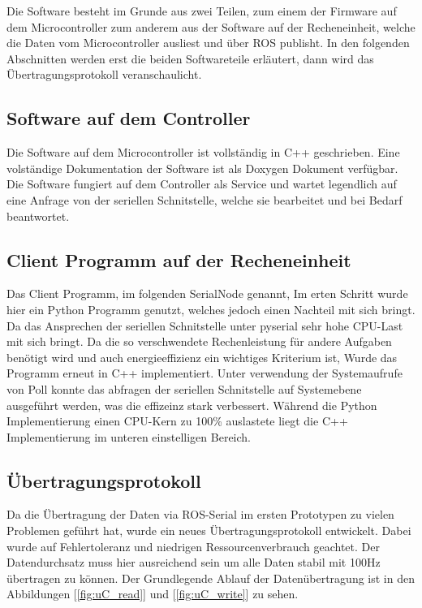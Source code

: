 Die Software besteht im Grunde aus zwei Teilen, zum einem der Firmware auf dem Microcontroller zum anderem aus der Software auf der Recheneinheit, welche die Daten vom Microcontroller ausliest und über ROS publisht.
In den folgenden Abschnitten werden erst die beiden Softwareteile erläutert, dann wird das Übertragungsprotokoll veranschaulicht.


\subsection{Software auf dem \textmu Controller}
Die Software auf dem Microcontroller ist vollständig in C++ geschrieben. Eine volständige Dokumentation der Software ist als Doxygen Dokument verfügbar. 
Die Software fungiert auf dem Controller als Service und wartet legendlich auf eine Anfrage von der seriellen Schnitstelle, welche sie bearbeitet und bei Bedarf beantwortet. 


\subsection{Client Programm auf der Recheneinheit}
Das Client Programm, im folgenden SerialNode genannt,
Im erten Schritt wurde hier ein Python Programm genutzt, welches jedoch einen Nachteil mit sich bringt. Da das Ansprechen der seriellen Schnitstelle unter pyserial sehr hohe CPU-Last mit sich bringt.
Da die so verschwendete Rechenleistung für andere Aufgaben benötigt wird und auch energieeffizienz ein wichtiges Kriterium ist, Wurde das Programm erneut in C++ implementiert. Unter verwendung der Systemaufrufe von 
Poll konnte das abfragen der seriellen Schnitstelle auf Systemebene ausgeführt werden, was die effizeinz stark verbessert. Während die Python Implementierung einen CPU-Kern zu 100\%
auslastete liegt die C++ Implementierung im unteren einstelligen Bereich.


\subsection{Übertragungsprotokoll}
Da die Übertragung der Daten via ROS-Serial im ersten Prototypen zu vielen Problemen geführt hat, wurde ein neues Übertragungsprotokoll entwickelt.
Dabei wurde auf Fehlertoleranz und niedrigen Ressourcenverbrauch geachtet. Der Datendurchsatz muss hier ausreichend sein um alle Daten stabil mit 100Hz
übertragen zu können.
Der Grundlegende Ablauf der Datenübertragung ist in den Abbildungen [\ref{fig:uC_read}] und [\ref{fig:uC_write}] zu sehen.

